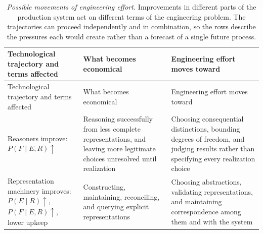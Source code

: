 {\footnotesize
\begin{longtable}[]{@{}
  >{\raggedright\arraybackslash}p{}
  >{\raggedright\arraybackslash}p{}
  >{\raggedright\arraybackslash}p{}@{}}
\caption[How technological progress can redirect engineering effort]{\emph{Possible movements of engineering effort.} Improvements in different parts of the production system act on different terms of the  engineering problem. The trajectories can proceed independently and in combination, so the rows describe the pressures each would create rather than a forecast of a single future process.}\label{effort-trajectories}\tabularnewline
\toprule\noalign{}
\begin{minipage}[b]{\linewidth}\raggedright
Technological trajectory and terms affected
\end{minipage} & \begin{minipage}[b]{\linewidth}\raggedright
What becomes economical
\end{minipage} & \begin{minipage}[b]{\linewidth}\raggedright
Engineering effort moves toward
\end{minipage} \\
\midrule\noalign{}
\endfirsthead
\toprule\noalign{}
\begin{minipage}[b]{\linewidth}\raggedright
Technological trajectory and terms affected
\end{minipage} & \begin{minipage}[b]{\linewidth}\raggedright
What becomes economical
\end{minipage} & \begin{minipage}[b]{\linewidth}\raggedright
Engineering effort moves toward
\end{minipage} \\
\midrule\noalign{}
\endhead
\bottomrule\noalign{}
\endlastfoot
Reasoners improve: \(P(F \mid E,R)\uparrow\) & Reasoning successfully from less complete representations, and leaving more legitimate choices unresolved until realization & Choosing consequential distinctions, bounding degrees of freedom, and judging results rather than specifying every realization choice \\
Representation machinery improves: \(P(E \mid R)\uparrow\), \(P(F \mid E,R)\uparrow\), lower upkeep & Constructing, maintaining, reconciling, and querying explicit representations & Choosing abstractions, validating representations, and maintaining correspondence among them and with the system \\

\end{longtable}}
